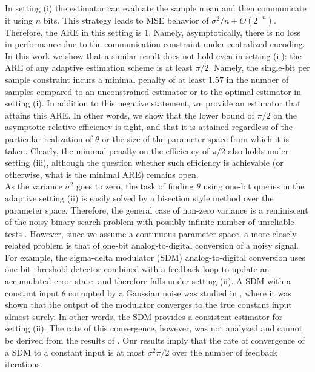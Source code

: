 \documentclass[letterpaper, conference]{IEEEtran}      %
\begin{document}
In setting (i) the estimator can evaluate the sample mean and then communicate it using $n$ bits. This strategy leads to MSE behavior of $\sigma^2/n + O(2^{-n})$. Therefore, the ARE in this setting is $1$. Namely, asymptotically, there is no loss in performance due to the communication constraint under centralized encoding. In this work we show that a similar result does not hold even in setting (ii): the ARE of any adaptive estimation scheme is at least $\pi/2$. Namely, the single-bit per sample constraint incurs a minimal penalty of at least $1.57$ in the number of samples compared to an unconstrained estimator or to the optimal estimator in setting (i). In addition to this negative statement, we provide an estimator that attains this ARE. In other words, we show that the lower bound of $\pi/2$ on the asymptotic relative efficiency is tight, and that it is attained regardless of the particular realization of $\theta$ or the size of the parameter space from which it is taken. Clearly, the minimal penalty on the efficiency of $\pi/2$ also holds under setting (iii), although the question whether such efficiency is achievable (or otherwise, what is the minimal ARE) remains open.  \\

As the variance $\sigma^2$ goes to zero, the task of finding $\theta$ using one-bit queries in the adaptive setting (ii) is easily solved by a bisection style method over the parameter space. Therefore, the general case of non-zero variance is a reminiscent of the noisy binary search problem with possibly infinite number of unreliable tests \cite{cicalese2002least, Karp:2007:NBS:1283383.1283478}. However, since we assume a continuous parameter space, a more closely related problem is that of one-bit analog-to-digital conversion of a noisy signal. For example, the sigma-delta modulator (SDM) analog-to-digital conversion \cite{1092194} uses one-bit threshold detector combined with a feedback loop to update an accumulated error state, and therefore falls under setting (ii). A SDM with a constant input $\theta$ corrupted by a Gaussian noise was studied in \cite{53738}, where it was shown that the output of the modulator converges to the true constant input almost surely. In other words, the SDM provides a consistent estimator for setting (ii). The rate of this convergence, however, was not analyzed and cannot be derived from the results of \cite{53738}. Our results imply that the rate of convergence of a SDM to a constant input is at most $\sigma^2\pi/2$ over the number of feedback iterations. \\
\end{document}

